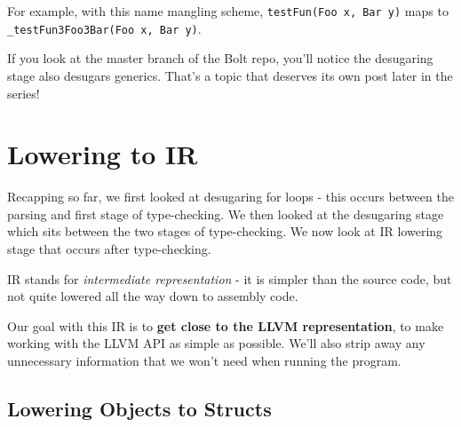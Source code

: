 For example, with this name mangling scheme,
\texttt{testFun(Foo\ x,\ Bar\ y)} maps to
\texttt{\_testFun3Foo3Bar(Foo\ x,\ Bar\ y)}.

If you look at the master branch of the Bolt repo, you'll notice the
desugaring stage also desugars generics. That's a topic that deserves
its own post later in the series!

\hypertarget{lowering-to-ir}{%
\section{\texorpdfstring{\protect\hyperlink{lowering-to-ir}{}Lowering
to IR}{Lowering to IR}}\label{lowering-to-ir}}

Recapping so far, we first looked at desugaring for loops - this occurs
between the parsing and first stage of type-checking. We then looked at
the desugaring stage which sits between the two stages of type-checking.
We now look at IR lowering stage that occurs after type-checking.

IR stands for \emph{intermediate representation} - it is simpler than
the source code, but not quite lowered all the way down to assembly
code.

Our goal with this IR is to \textbf{get close to the LLVM
representation}, to make working with the LLVM API as simple as
possible. We'll also strip away any unnecessary information that we
won't need when running the program.

%
%
%
%

\hypertarget{lowering-objects-to-structs}{%
\subsection{\texorpdfstring{\protect\hyperlink{lowering-objects-to-structs}{}Lowering
Objects to
Structs}{Lowering Objects to Structs}}\label{lowering-objects-to-structs}}

